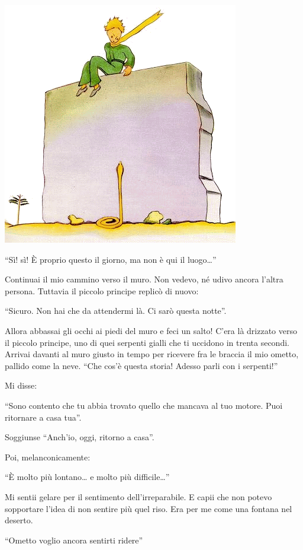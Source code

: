 \documentclass[11pt]{scrbook}
\begin{document}
\begin{center}
\includegraphics{img/26a}
\end{center}

``Sì! sì! È proprio questo il giorno, ma non è qui il luogo\ldots{}''

Continuai il mio cammino verso il muro. Non vedevo, né udivo ancora l'altra persona. Tuttavia il piccolo principe replicò di nuovo:

``Sicuro. Non hai che da attendermi là. Ci sarò questa notte''.

Allora abbassai gli occhi ai piedi del muro e feci un salto! C'era là drizzato verso il piccolo principe, uno di quei serpenti gialli che ti uccidono in trenta secondi. Arrivai davanti al muro giusto in tempo per ricevere fra le braccia il mio ometto, pallido come la neve. ``Che cos'è questa storia! Adesso parli con i serpenti!''

Mi disse:

``Sono contento che tu abbia trovato quello che mancava al tuo motore. Puoi ritornare a casa tua''.

Soggiunse ``Anch'io, oggi, ritorno a casa''.

Poi, melanconicamente:

``È molto più lontano\ldots{} e molto più difficile\ldots{}''

Mi sentii gelare per il sentimento dell'irreparabile. E capii che non potevo sopportare l'idea di non sentire più quel riso. Era per me come una fontana nel deserto.

``Ometto voglio ancora sentirti ridere''
\end{document}
